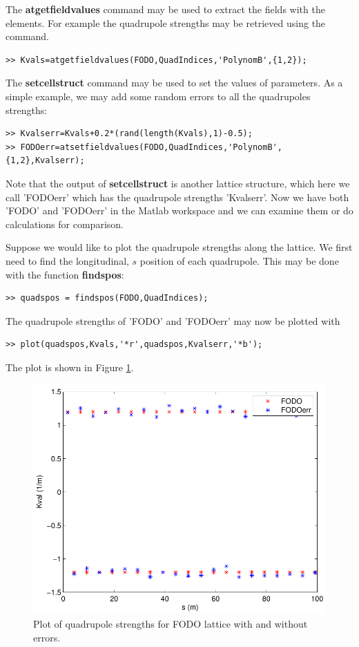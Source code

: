 \documentclass[acus]{article}
\newcommand{\mfun}[1]{{\bf{#1}}}
\begin{document}
The \mfun{atgetfieldvalues} command may be used to extract the fields with the elements.  For example the quadrupole strengths may be 
retrieved using the command.
 \begin{verbatim}
>> Kvals=atgetfieldvalues(FODO,QuadIndices,'PolynomB',{1,2});
\end{verbatim}
The \mfun{setcellstruct} command may be used to set the values of parameters.  As a simple example, we may add some
random errors to all the quadrupoles strengths:
 \begin{verbatim}
>> Kvalserr=Kvals+0.2*(rand(length(Kvals),1)-0.5);
>> FODOerr=atsetfieldvalues(FODO,QuadIndices,'PolynomB',{1,2},Kvalserr);
\end{verbatim}
Note that the output of \mfun{setcellstruct} is another lattice structure, which here we call 'FODOerr' which has the
quadrupole strengths 'Kvalserr'.  Now we have both 'FODO' and 'FODOerr' in the Matlab workspace and we can examine
them or do calculations for comparison.

Suppose we would like to plot the quadrupole strengths along the lattice.  We first need to find the
longitudinal, $s$
position of each quadrupole.  This may be done with the function \mfun{findspos}:
\begin{verbatim}
>> quadspos = findspos(FODO,QuadIndices);
\end{verbatim}
The quadrupole strengths of 'FODO' and 'FODOerr' may now be plotted with
\begin{verbatim}
>> plot(quadspos,Kvals,'*r',quadspos,Kvalserr,'*b');
\end{verbatim}
The plot is shown in Figure \ref{quadplot}.
\begin{figure}[htb]
\centering
\includegraphics[scale=0.5]{quadplot.pdf}
\caption{Plot of quadrupole strengths for FODO lattice with and without errors.}
\label{quadplot}
\end{figure}
\end{document}
